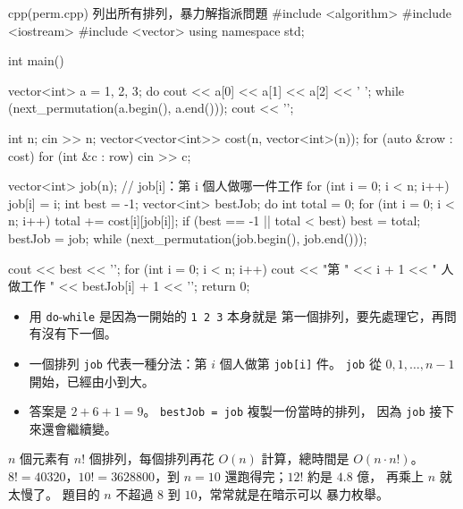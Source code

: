 \begin{example}[label=ex:perm]{cpp}{(perm.cpp) 列出所有排列，暴力解指派問題}
#include <algorithm>
#include <iostream>
#include <vector>
using namespace std;

int main() {
    vector<int> a = {1, 2, 3};
    do {
        cout << a[0] << a[1] << a[2] << ' ';
    } while (next_permutation(a.begin(), a.end()));
    cout << '\n';

    int n;
    cin >> n;
    vector<vector<int>> cost(n, vector<int>(n));
    for (auto &row : cost) {
        for (int &c : row) {
            cin >> c;
        }
    }

    vector<int> job(n);              // job[i]：第 i 個人做哪一件工作
    for (int i = 0; i < n; i++) {
        job[i] = i;
    }
    int best = -1;
    vector<int> bestJob;
    do {
        int total = 0;
        for (int i = 0; i < n; i++) {
            total += cost[i][job[i]];
        }
        if (best == -1 || total < best) {
            best = total;
            bestJob = job;
        }
    } while (next_permutation(job.begin(), job.end()));

    cout << best << '\n';
    for (int i = 0; i < n; i++) {
        cout << "第 " << i + 1 << " 人做工作 " << bestJob[i] + 1
             << '\n';
    }
    return 0;
}
\end{example}


\begin{itemize}
\item 用 \texttt{do}-\texttt{while} 是因為一開始的 \texttt{1 2 3} 本身就是
第一個排列，要先處理它，再問有沒有下一個。
\item 一個排列 \texttt{job} 代表一種分法：第 $i$ 個人做第 \texttt{job[i]}
件。 \texttt{job} 從 $0, 1, \dots, n - 1$ 開始，已經由小到大。
\item 答案是 $2 + 6 + 1 = 9$。 \texttt{bestJob = job} 複製一份當時的排列，
因為 \texttt{job} 接下來還會繼續變。
\end{itemize}

$n$ 個元素有 $n!$ 個排列，每個排列再花 $O(n)$ 計算，總時間是 $O(n \cdot n!)$。
$8! = 40320$，$10! = 3628800$，到 $n = 10$ 還跑得完；$12!$ 約是 $4.8$ 億，
再乘上 $n$ 就太慢了。 題目的 $n$ 不超過 $8$ 到 $10$，常常就是在暗示可以
暴力枚舉。

